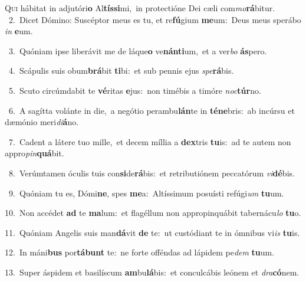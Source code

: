 \lettrine{\initial\textcolor{\initialcolor}{Q}}{ui} hábitat in adjutóri\textbf{o} Al\-\textbf{tís}\-\textbf{si}mi,~\star in protectióne Dei cæli com\-\textit{mo}\-\textbf{rá}bitur.\\
{\numbfont\textcolor{\numbcolor}{~2.}}~Dicet Dómino: Suscéptor meus es tu, et re\-\textbf{fú}\-gium \textbf{me}\-um:~\star Deus meus sperábo \textit{in} \textbf{e}\-um.\par
{\numbfont\textcolor{\numbcolor}{~3.}}~Quóniam ipse liberávit me de láque\textbf{o} ve\-\textbf{nán}\-\textbf{ti}um,~\star et a ver\textit{bo} \textbf{ás}\-pero.\par
{\numbfont\textcolor{\numbcolor}{~4.}}~Scápulis suis obum\-\textbf{brá}\-bit \textbf{ti}\-bi:~\star et sub pennis ejus \textit{spe}\-\textbf{rá}bis.\par
{\numbfont\textcolor{\numbcolor}{~5.}}~Scuto circúmdabit te \textbf{vé}\-ritas \textbf{e}\-jus:~\star non timébis a timóre \textit{noc}\-\textbf{túr}no.\par
{\numbfont\textcolor{\numbcolor}{~6.}}~A sagítta volánte in die,~\dagger a negótio perambu\-\textbf{lán}\-te in \textbf{té}\-\textbf{ne}bris:~\star ab incúrsu et dæmónio meri\-\textit{di}\-\textbf{á}no.\par
{\numbfont\textcolor{\numbcolor}{~7.}}~Cadent a látere tuo mille,~\dagger et decem míllia a \textbf{dex}\-tris \textbf{tu}\-is:~\star ad te autem non appro\-\textit{pin}\-\textbf{quá}bit.\par
{\numbfont\textcolor{\numbcolor}{~8.}}~Verúmtamen óculis tuis con\-\textbf{si}\-de\-\textbf{rá}\-bis:~\star et retributiónem peccatórum \textit{vi}\-\textbf{dé}bis.\par
{\numbfont\textcolor{\numbcolor}{~9.}}~Quóniam tu es, Dómi\-\textbf{ne}\-, spes \textbf{me}\-a:~\star Altíssimum posuísti refúgi\textit{um} \textbf{tu}\-um.\par
{\numbfont\textcolor{\numbcolor}{10.}}~Non accédet \textbf{ad} te \textbf{ma}\-lum:~\star et flagéllum non appropinquábit tabernácu\textit{lo} \textbf{tu}\-o.\par
{\numbfont\textcolor{\numbcolor}{11.}}~Quóniam Angelis suis man\-\textbf{dá}\-vit \textbf{de} te:~\star ut custódiant te in ómnibus vi\textit{is} \textbf{tu}\-is.\par
{\numbfont\textcolor{\numbcolor}{12.}}~In máni\textbf{bus} por\-\textbf{tá}\-\textbf{bunt} te:~\star ne forte offéndas ad lápidem pe\textit{dem} \textbf{tu}\-um.\par
{\numbfont\textcolor{\numbcolor}{13.}}~Super áspidem et basilíscum \textbf{am}\-bu\-\textbf{lá}\-bis:~\star et conculcábis leónem et \textit{dra}\-\textbf{có}nem.\par
